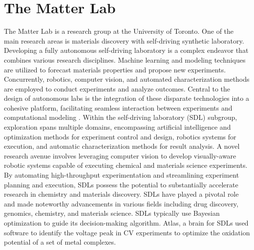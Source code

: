 \section{The Matter Lab}
The Matter Lab is a research group at the University of Toronto. One of the main research areas is materials discovery with self-driving synthetic laboratory. Developing a fully autonomous self-driving laboratory is a complex endeavor that combines various research disciplines. Machine learning and modeling techniques are utilized to forecast materials properties and propose new experiments. Concurrently, robotics, computer vision, and automated characterization methods are employed to conduct experiments and analyze outcomes. Central to the design of autonomous labs is the integration of these disparate technologies into a cohesive platform, facilitating seamless interaction between experiments and computational modeling \cite{StriethKalthoff2023}.
Within the self-driving laboratory (SDL) subgroup, exploration spans multiple domains, encompassing artificial intelligence and optimization methods for experiment control and design, robotics systems for execution, and automatic characterization methods for result analysis. A novel research avenue involves leveraging computer vision to develop visually-aware robotic systems capable of executing chemical and materials science experiments.
By automating high-throughput experimentation and streamlining experiment planning and execution, SDLs possess the potential to substantially accelerate research in chemistry and materials discovery. SDLs have played a pivotal role and made noteworthy advancements in various fields including drug discovery, genomics, chemistry, and materials science. 
SDLs typically use Bayesian optimization to guide its decision-making algorithm. Atlas, a brain for SDLs used software to identify the voltage peak in CV experiments to optimize the oxidation potential of a set of metal complexes. 